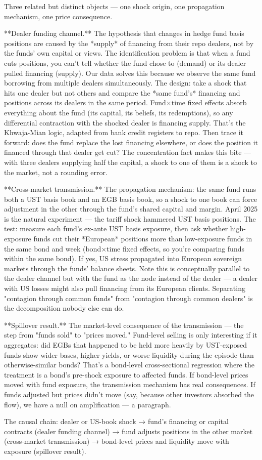 Three related but distinct objects — one shock origin, one propagation mechanism, one price consequence.

**Dealer funding channel.** The hypothesis that changes in hedge fund basis positions are caused by the *supply* of financing from their repo dealers, not by the funds' own capital or views. The identification problem is that when a fund cuts positions, you can't tell whether the fund chose to (demand) or its dealer pulled financing (supply). Our data solves this because we observe the same fund borrowing from multiple dealers simultaneously. The design: take a shock that hits one dealer but not others and compare the *same fund's* financing and positions across its dealers in the same period. Fund×time fixed effects absorb everything about the fund (its capital, its beliefs, its redemptions), so any differential contraction with the shocked dealer is financing supply. That's the Khwaja-Mian logic, adapted from bank credit registers to repo. Then trace it forward: does the fund replace the lost financing elsewhere, or does the position it financed through that dealer get cut? The concentration fact makes this bite — with three dealers supplying half the capital, a shock to one of them is a shock to the market, not a rounding error.

**Cross-market transmission.** The propagation mechanism: the same fund runs both a UST basis book and an EGB basis book, so a shock to one book can force adjustment in the other through the fund's shared capital and margin. April 2025 is the natural experiment — the tariff shock hammered UST basis positions. The test: measure each fund's ex-ante UST basis exposure, then ask whether high-exposure funds cut their *European* positions more than low-exposure funds in the same bond and week (bond×time fixed effects, so you're comparing funds within the same bond). If yes, US stress propagated into European sovereign markets through the funds' balance sheets. Note this is conceptually parallel to the dealer channel but with the fund as the node instead of the dealer — a dealer with US losses might also pull financing from its European clients. Separating "contagion through common funds" from "contagion through common dealers" is the decomposition nobody else can do.

**Spillover result.** The market-level consequence of the transmission — the step from "funds sold" to "prices moved." Fund-level selling is only interesting if it aggregates: did EGBs that happened to be held more heavily by UST-exposed funds show wider bases, higher yields, or worse liquidity during the episode than otherwise-similar bonds? That's a bond-level cross-sectional regression where the treatment is a bond's pre-shock exposure to affected funds. If bond-level prices moved with fund exposure, the transmission mechanism has real consequences. If funds adjusted but prices didn't move (say, because other investors absorbed the flow), we have a null on amplification —  a paragraph.

The causal chain: dealer or US-book shock → fund's financing or capital contracts (dealer funding channel) → fund adjusts positions in the other market (cross-market transmission) → bond-level prices and liquidity move with exposure (spillover result).